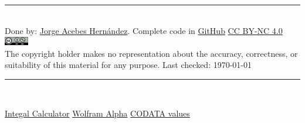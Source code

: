 \hrule
~\\
Done by: \href{https://www.linkedin.com/in/jorge-acebes-hern\%C3\%A1ndez/}{Jorge Acebes Hernández}. Complete code in \href{https://github.com/JorgeAcebes/Math_For_Physics_CheatSheet}{GitHub} 
\; \; \;\; \href{https://creativecommons.org/licenses/by-nc/4.0/}{CC BY-NC 4.0}
\;\;\;\; \includegraphics[height=1em]{sections/ccbync.png}\\
The copyright holder makes no representation about the accuracy, correctness, or suitability of
this material for any purpose. Last checked: \today
\vfill
\hrule
~\\
\begin{centering}
\href{https://www.integral-calculator.com/}{Integal Calculator} \;\;
\href{https://www.wolframalpha.com/}{Wolfram Alpha}\;\;
\href{https://physics.nist.gov/cuu/Constants/index.html}{CODATA values}

\end{centering}




